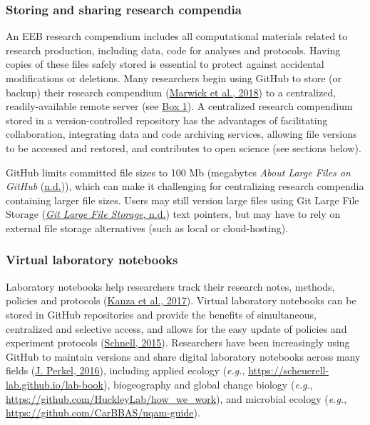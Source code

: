 \hypertarget{storing-and-sharing-research-compendia}{%
\subsubsection{Storing and sharing research compendia}\label{storing-and-sharing-research-compendia}}

An EEB research compendium includes all computational materials related to research production, including data, code for analyses and protocols.
Having copies of these files safely stored is essential to protect against accidental modifications or deletions.
Many researchers begin using GitHub to store (or backup) their research compendium (\protect\hyperlink{ref-MwwMapRG}{Marwick et al., 2018}) to a centralized, readily-available remote server (see \protect\hyperlink{definitions}{Box 1}).
A centralized research compendium stored in a version-controlled repository has the advantages of facilitating collaboration, integrating data and code archiving services, allowing file versions to be accessed and restored, and contributes to open science (see sections below).

GitHub limits committed file sizes to 100 Mb (megabytes \emph{About Large Files on GitHub} (\protect\hyperlink{ref-1Co6ZZjF1}{n.d.})), which can make it challenging for centralizing research compendia containing larger file sizes.
Users may still version large files using Git Large File Storage (\protect\hyperlink{ref-11GtZ7icJ}{\emph{Git Large File Storage}, n.d.}) text pointers, but may have to rely on external file storage alternatives (such as local or cloud-hosting).

\hypertarget{virtual-laboratory-notebooks}{%
\subsubsection{Virtual laboratory notebooks}\label{virtual-laboratory-notebooks}}

Laboratory notebooks help researchers track their research notes, methods, policies and protocols (\protect\hyperlink{ref-wwHxTOtm}{Kanza et al., 2017}).
Virtual laboratory notebooks can be stored in GitHub repositories and provide the benefits of simultaneous, centralized and selective access, and allows for the easy update of policies and experiment protocols (\protect\hyperlink{ref-10V7x4H4l}{Schnell, 2015}).
Researchers have been increasingly using GitHub to maintain versions and share digital laboratory notebooks across many fields (\protect\hyperlink{ref-10ghgV3S8}{J. Perkel, 2016}), including applied ecology (\emph{e.g.}, \url{https://scheuerell-lab.github.io/lab-book}), biogeography and global change biology (\emph{e.g.}, \url{https://github.com/HuckleyLab/how_we_work}), and microbial ecology (\emph{e.g.}, \url{https://github.com/CarBBAS/uqam-guide}).

